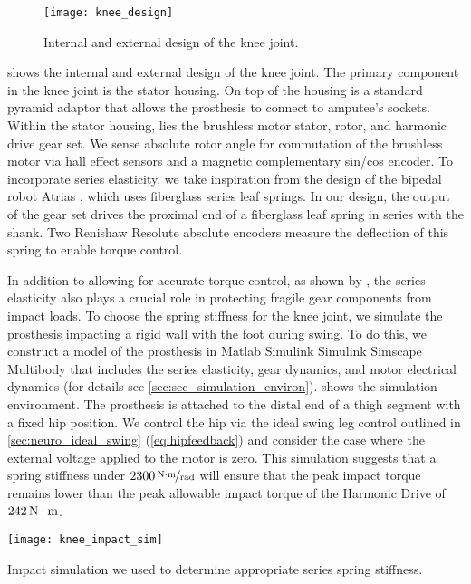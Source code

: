 \begin{figure*}[t]
    \centering 
    \texttt{[image: knee\_design]}
    \caption{Internal and external design of the knee 
    joint.}\label{fig:knee_design}
\end{figure*}
 shows the internal and external design of the knee joint.
The primary component in the knee joint is the stator housing. On top of the
housing is a standard pyramid adaptor that allows the prosthesis to connect to
amputee's sockets. Within the stator housing, lies the brushless motor stator,
rotor, and harmonic drive gear set. We sense absolute rotor angle for
commutation of the brushless motor via hall effect sensors and a magnetic
complementary sin/cos encoder. To incorporate series elasticity, we take
inspiration from the design of the bipedal robot Atrias
\citep{grimes2013atrias}, which uses fiberglass series leaf springs. In our
design, the output of the gear set drives the proximal end of a fiberglass leaf
spring in series with the shank. Two Renishaw Resolute absolute encoders measure
the deflection of this spring to enable torque control.

In addition to allowing for accurate torque control, as shown by
\citet{au2007biomechanical,au2008powered}, the series elasticity also plays a
crucial role in protecting fragile gear components from impact loads. To choose
the spring stiffness for the knee joint, we simulate the prosthesis impacting a
rigid wall with the foot during swing. To do this, we construct a model of the
prosthesis in Matlab Simulink Simulink Simscape Multibody that includes the
series elasticity, gear dynamics, and motor electrical dynamics (for
details see \cref{sec:sec_simulation_environ}).  shows
the simulation environment. The prosthesis is attached to the distal end of a
thigh segment with a fixed hip position. We control the hip via the ideal swing
leg control outlined in \cref{sec:neuro_ideal_swing} (\cref{eq:hipfeedback}) and
consider the case where the external voltage applied to the motor is zero. This
simulation suggests that a spring stiffness under $\unitfrac[2300]{N \cdot
m}{rad}$ will ensure that the peak impact torque remains lower than the peak
allowable impact torque of the Harmonic Drive of $\unit[242]{N \cdot m}$.
\begin{marginfigure}[-2.5in]
    \centering 
    \texttt{[image: knee\_impact\_sim]}
    \caption{Impact simulation we used to determine appropriate series spring
    stiffness.}\label{fig:knee_impact sim}
\end{marginfigure}

